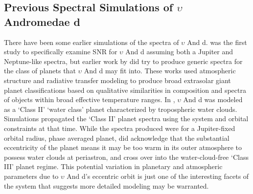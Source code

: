 \documentclass[12pt, letterpaper]{aastex631}
\begin{document}
\subsection{Previous Spectral Simulations of $\upsilon$ Andromedae d} \label{subsec:prevsims}

There have been some earlier simulations of the spectra of $\upsilon$ And d.  \textcite{2019AJ....157..132L} was the first study to specifically examine SNR for $\upsilon$ And d assuming both a Jupiter and Neptune-like spectra, but earlier work by \textcite{Sudarsky_2000, Sudarsky_2003} did try to produce generic spectra for the class of planets that $\upsilon$ And d may fit into.  These works used atmospheric structure and radiative transfer modeling to produce broad extrasolar giant planet classifications based on qualitative similarities in composition and spectra of objects within broad effective temperature ranges.  In \textcite{Sudarsky_2003}, $\upsilon$ And d was modeled as a `Class II' `water class' planet characterized by tropospheric water clouds.  Simulations propagated the `Class II' planet spectra using the system and orbital constraints at that time.  While the spectra produced were for a Jupiter-fixed orbital radius, phase averaged planet, \textcite{Sudarsky_2003} did acknowledge that the substantial eccentricity of the planet means it may be too warm in its outer atmosphere to possess water clouds at periastron, and cross over into the water-cloud-free `Class III' planet regime.  This potential variation in planetary and atmospheric parameters due to $\upsilon$ And d's eccentric orbit is just one of the interesting facets of the system that suggests more detailed modeling may be warranted.  
\end{document}
